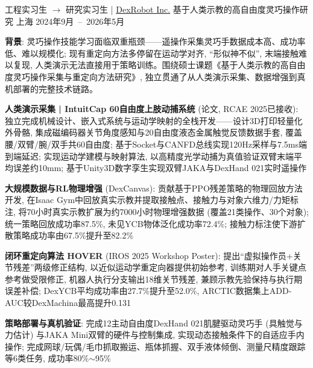 
\vspace{-6mm}

\begin{cventries}

    \cventry
      {工程实习生 $\rightarrow$ 研究实习生 | \href{https://dex-robot.com}{DexRobot Inc.}} %
      {基于人类示教的高自由度灵巧操作研究} %
      {上海} %
      {2024年9月~--~2026年5月} %
      {
        \textbf{背景}: 灵巧操作技能学习面临双重瓶颈——遥操作采集灵巧手数据成本高、成功率低、难以规模化; 现有重定向方法多停留在运动学对齐, “形似神不似”, 末端接触难以复现, 人类演示无法直接用于策略训练。围绕硕士课题《基于人类示教的高自由度灵巧操作采集与重定向方法研究》, 独立贯通了从人类演示采集、数据增强到真机部署的完整技术链路。
        \begin{cvitems}
          \item{\textbf{人类演示采集 | IntuitCap 60自由度上肢动捕系统} (论文, RCAE 2025已接收): 独立完成机械设计、嵌入式系统与运动学映射的全栈开发——设计3D打印轻量化外骨骼, 集成磁编码器关节角度感知与20自由度液态金属触觉反馈数据手套, 覆盖腰/双臂/腕/双手共60自由度; 基于Socket与CANFD总线实现120Hz采样与7.5ms端到端延迟; 实现运动学建模与映射算法, 以高精度光学动捕为真值验证双臂末端平均误差约10mm; 基于Unity3D数字孪生实现双臂JAKA与DexHand 021实时遥操作}
          \item{\textbf{大规模数据与RL物理增强} (DexCanvas): 贡献基于PPO残差策略的物理回放方法开发, 在Isaac Gym中回放真实示教并提取接触点、接触力与对象六维力/力矩标注, 将70小时真实示教扩展为约7000小时物理增强数据 (覆盖21类操作、30个对象); 统一策略回放成功率87.5\%, 未见YCB物体泛化成功率72.4\%; 接触力标注使下游扩散策略成功率由67.5\%提升至82.2\%}
          \item{\textbf{闭环重定向算法 HOVER} (IROS 2025 Workshop Poster): 提出“虚拟操作员+关节残差”两级修正结构, 以近似运动学重定向器提供初始参考, 训练期对人手关键点参考做受限修正, 机器人执行分支输出18维关节残差, 兼顾示教先验保持与执行期误差补偿; DexYCB平均成功率由27.7\%提升至52.0\%, ARCTIC数据集上ADD-AUC较DexMachina最高提升0.131}
          \item{\textbf{策略部署与真机验证}: 完成12主动自由度DexHand 021肌腱驱动灵巧手 (具触觉与力估计) 与JAKA Mini双臂的硬件与控制集成, 实现动态接触条件下的自适应手内操作; 完成网球/玩偶/毛巾抓取搬运、瓶体抓握、双手液体倾倒、测量尺精度跟踪等6类任务, 成功率80\%$\sim$95\%}
        \end{cvitems}
        \vspace{2mm}
      }%
\end{cventries}
